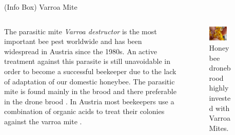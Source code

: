 \documentclass{beamer}
\begin{document}
\begin{frame}{}
\begin{columns}[t]
\begin{column}{0.49\textwidth}
  \end{column}
  \begin{column}{0.49\textwidth}

    {
      \begin{block}{(Info Box) Varroa Mite}
      \begin{columns}[t,onlytextwidth]
        \begin{column}[t]{.5\linewidth}
        The parasitic mite \textit{Varroa destructor} is the most important bee pest worldwide and has been widespread in Austria since the 1980s. An active treatment against this parasite is still unavoidable in order to become a successful beekeeper due to the lack of adaptation of our domestic honeybee. The parasitic mite is found mainly in the brood and there preferable in the drone brood \citep{rosenkranz2010}. In Austria most beekeepers use a combination of organic acids to treat their colonies against the varroa mite \citep{oberreiter2020}.
        \end{column}
        \begin{column}[t]{.5\linewidth}
        \begin{figure}
        \centering
        \includegraphics[width=0.8\textwidth]{img/varroa.jpg}
        \caption{Honeybee dronebrood highly invested with Varroa Mites.}
        \end{figure}
        \end{column}
      \end{columns}
      \end{block}
    }


\end{column}
\end{columns}
\end{frame}
\end{document}
